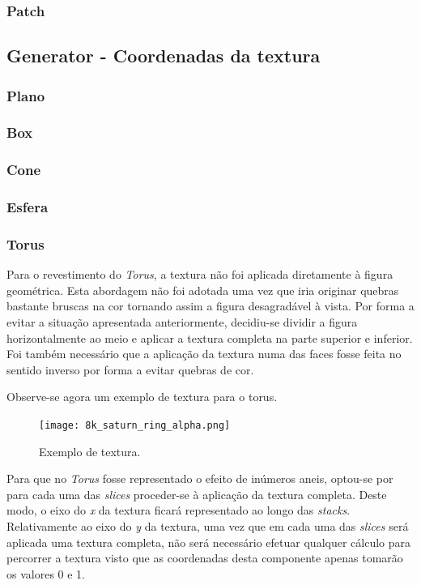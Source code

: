 \documentclass[a4paper]{article}
\begin{document}
\subsubsection{Patch}%

\subsection{Generator - Coordenadas da textura} 

\subsubsection{Plano}
\subsubsection{Box}
\subsubsection{Cone}
\subsubsection{Esfera}
\subsubsection{Torus}%

\hspace{3mm} Para o revestimento do \textit{Torus}, a textura não foi aplicada diretamente à figura geométrica. Esta abordagem não foi adotada uma vez que iria originar quebras bastante bruscas na cor tornando assim a figura desagradável à vista. Por forma a evitar a situação apresentada anteriormente, decidiu-se dividir a figura horizontalmente ao meio e aplicar a textura completa na parte superior e inferior. Foi também necessário que a aplicação da textura numa das faces fosse feita no sentido inverso por forma a evitar quebras de cor.

Observe-se agora um exemplo de textura para o torus.

\begin{figure}[!h]
    \centering
    \texttt{[image: 8k\_saturn\_ring\_alpha.png]}
    \caption{Exemplo de textura.}
    \label{fig:ref_texture}
\end{figure}

Para que no \textit{Torus} fosse representado o efeito de inúmeros aneis, optou-se por para cada uma das \textit{slices} proceder-se à aplicação da textura completa. Deste modo, o eixo do \textit{x} da textura ficará representado ao longo das \textit{stacks}. Relativamente ao eixo do \textit{y} da textura, uma vez que em cada uma das \textit{slices} será aplicada uma textura completa, não será necessário efetuar qualquer cálculo para percorrer a textura visto que as coordenadas desta componente apenas tomarão os valores 0 e 1.
\end{document}
